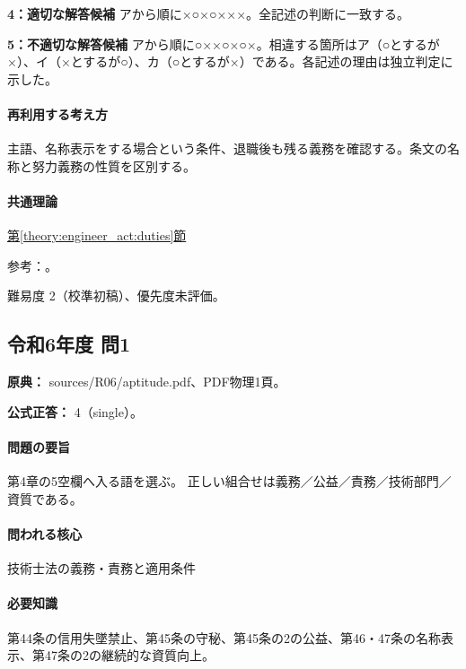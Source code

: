 \noindent\textbf{4：適切な解答候補} アから順に×○×○×××。全記述の判断に一致する。\par

\noindent\textbf{5：不適切な解答候補} アから順に○××○×○×。相違する箇所はア（○とするが×）、イ（×とするが○）、カ（○とするが×）である。各記述の理由は独立判定に示した。\par

\paragraph{再利用する考え方} 主語、名称表示をする場合という条件、退職後も残る義務を確認する。条文の名称と努力義務の性質を区別する。

\paragraph{共通理論} \hyperref[theory:engineer_act:duties]{第\ref*{theory:engineer_act:duties}節}

\par 参考：\cite{engineer_act_current}。

\par 難易度 2（校準初稿）、優先度未評価。

\subsection{令和6年度 問1}
\label{q:r06-reg-apt-01}

\noindent\textbf{原典：} sources/R06/aptitude.pdf、PDF物理1頁。

\textbf{公式正答：} 4（single）。

\paragraph{問題の要旨} 第4章の5空欄へ入る語を選ぶ。 正しい組合せは義務／公益／責務／技術部門／資質である。

\paragraph{問われる核心} 技術士法の義務・責務と適用条件

\paragraph{必要知識} 第44条の信用失墜禁止、第45条の守秘、第45条の2の公益、第46・47条の名称表示、第47条の2の継続的な資質向上。

